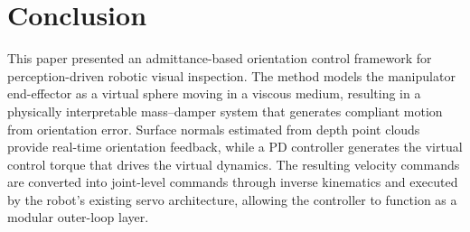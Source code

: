 \documentclass[journal]{IEEEtran}
\begin{document}
%







\section{Conclusion}

This paper presented an admittance-based orientation control framework for perception-driven robotic visual inspection. The method models the manipulator end-effector as a virtual sphere moving in a viscous medium, resulting in a physically interpretable mass–damper system that generates compliant motion from orientation error. Surface normals estimated from depth point clouds provide real-time orientation feedback, while a PD controller generates the virtual control torque that drives the virtual dynamics. The resulting velocity commands are converted into joint-level commands through inverse kinematics and executed by the robot’s existing servo architecture, allowing the controller to function as a modular outer-loop layer.
\end{document}

